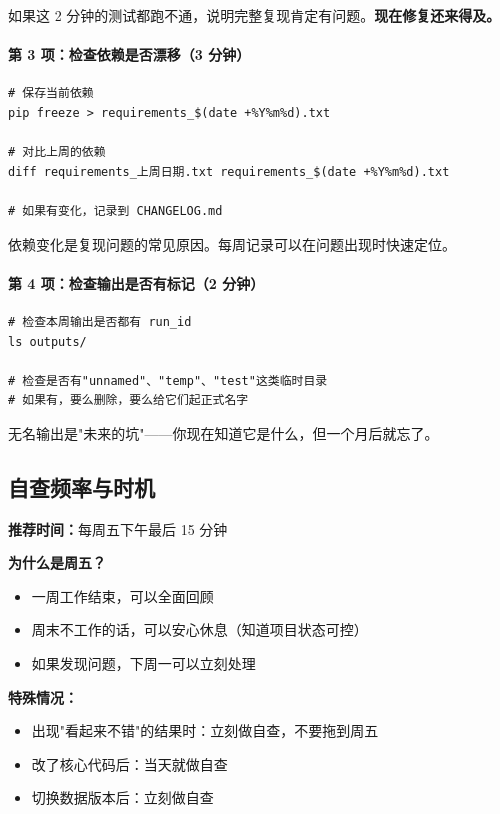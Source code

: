 如果这 2 分钟的测试都跑不通，说明完整复现肯定有问题。\textbf{现在修复还来得及。}

\paragraph{第 3 项：检查依赖是否漂移（3 分钟）}

\begin{verbatim}
# 保存当前依赖
pip freeze > requirements_$(date +%Y%m%d).txt

# 对比上周的依赖
diff requirements_上周日期.txt requirements_$(date +%Y%m%d).txt

# 如果有变化，记录到 CHANGELOG.md
\end{verbatim}

依赖变化是复现问题的常见原因。每周记录可以在问题出现时快速定位。

\paragraph{第 4 项：检查输出是否有标记（2 分钟）}

\begin{verbatim}
# 检查本周输出是否都有 run_id
ls outputs/

# 检查是否有"unnamed"、"temp"、"test"这类临时目录
# 如果有，要么删除，要么给它们起正式名字
\end{verbatim}

无名输出是"未来的坑"——你现在知道它是什么，但一个月后就忘了。

\subsection{自查频率与时机}

\textbf{推荐时间：}每周五下午最后 15 分钟

\textbf{为什么是周五？}
\begin{itemize}
  \item 一周工作结束，可以全面回顾
  \item 周末不工作的话，可以安心休息（知道项目状态可控）
  \item 如果发现问题，下周一可以立刻处理
\end{itemize}

\textbf{特殊情况：}
\begin{itemize}
  \item 出现"看起来不错"的结果时：立刻做自查，不要拖到周五
  \item 改了核心代码后：当天就做自查
  \item 切换数据版本后：立刻做自查
\end{itemize}

